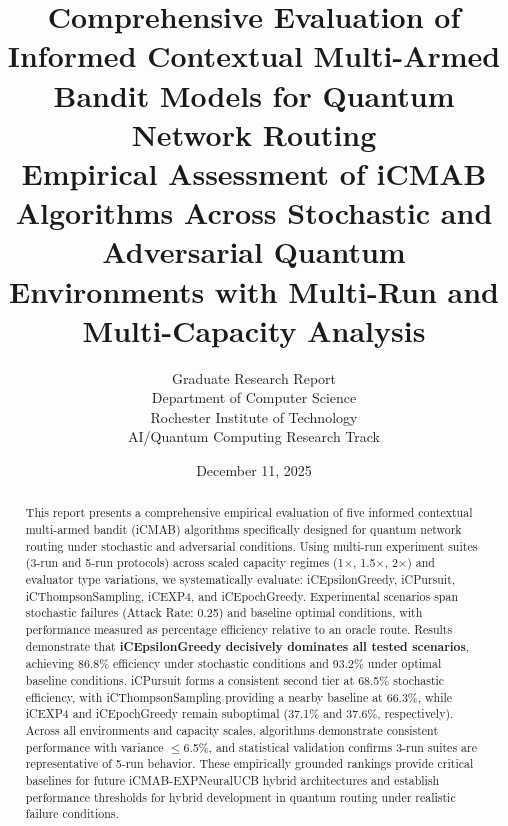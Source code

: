\documentclass[12pt,a4paper]{article}
\title{\textbf{Comprehensive Evaluation of Informed Contextual Multi-Armed Bandit Models for Quantum Network Routing}\\
\large{Empirical Assessment of iCMAB Algorithms Across Stochastic and Adversarial Quantum Environments with Multi-Run and Multi-Capacity Analysis}}
\author{Graduate Research Report\\
Department of Computer Science\\
Rochester Institute of Technology\\
AI/Quantum Computing Research Track}
\date{December 11, 2025}
\newcommand{\primarytext}[1]{\textcolor{primaryblue}{\textbf{#1}}}
\begin{document}
\maketitle

\begin{abstract}
This report presents a comprehensive empirical evaluation of five informed contextual multi-armed bandit (iCMAB) algorithms specifically designed for quantum network routing under stochastic and adversarial conditions. Using multi-run experiment suites (3-run and 5-run protocols) across scaled capacity regimes (1$\times$, 1.5$\times$, 2$\times$) and evaluator type variations, we systematically evaluate: iCEpsilonGreedy, iCPursuit, iCThompsonSampling, iCEXP4, and iCEpochGreedy. Experimental scenarios span stochastic failures (Attack Rate: 0.25) and baseline optimal conditions, with performance measured as percentage efficiency relative to an oracle route. Results demonstrate that \primarytext{iCEpsilonGreedy decisively dominates all tested scenarios}, achieving 86.8\% efficiency under stochastic conditions and 93.2\% under optimal baseline conditions. iCPursuit forms a consistent second tier at 68.5\% stochastic efficiency, with iCThompsonSampling providing a nearby baseline at 66.3\%, while iCEXP4 and iCEpochGreedy remain suboptimal (37.1\% and 37.6\%, respectively). Across all environments and capacity scales, algorithms demonstrate consistent performance with variance $\leq$6.5\%, and statistical validation confirms 3-run suites are representative of 5-run behavior. These empirically grounded rankings provide critical baselines for future iCMAB-EXPNeuralUCB hybrid architectures and establish performance thresholds for hybrid development in quantum routing under realistic failure conditions.
\end{abstract}

\newpage
\tableofcontents

\newpage
\end{document}
